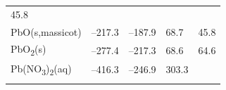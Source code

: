 \documentclass[
]{book}
\theoremstyle{definition}
\theoremstyle{definition}
\theoremstyle{definition}
\theoremstyle{remark}
\begin{document}
\begin{longtable}[]{@{}lllll@{}}
\begin{minipage}[t]{0.18\columnwidth}
45.8\strut
\end{minipage}\tabularnewline
\begin{minipage}[t]{0.10\columnwidth}\raggedright
PbO(s,massicot)\strut
\end{minipage} & \begin{minipage}[t]{0.19\columnwidth}\raggedright
--217.3\strut
\end{minipage} & \begin{minipage}[t]{0.20\columnwidth}\raggedright
--187.9\strut
\end{minipage} & \begin{minipage}[t]{0.18\columnwidth}\raggedright
68.7\strut
\end{minipage} & \begin{minipage}[t]{0.18\columnwidth}\raggedright
45.8\strut
\end{minipage}\tabularnewline
\begin{minipage}[t]{0.10\columnwidth}\raggedright
PbO\textsubscript{2}(s)\strut
\end{minipage} & \begin{minipage}[t]{0.19\columnwidth}\raggedright
--277.4\strut
\end{minipage} & \begin{minipage}[t]{0.20\columnwidth}\raggedright
--217.3\strut
\end{minipage} & \begin{minipage}[t]{0.18\columnwidth}\raggedright
68.6\strut
\end{minipage} & \begin{minipage}[t]{0.18\columnwidth}\raggedright
64.6\strut
\end{minipage}\tabularnewline
\begin{minipage}[t]{0.10\columnwidth}\raggedright
Pb(NO\textsubscript{3})\textsubscript{2}(aq)\strut
\end{minipage} & \begin{minipage}[t]{0.19\columnwidth}\raggedright
--416.3\strut
\end{minipage} & \begin{minipage}[t]{0.20\columnwidth}\raggedright
--246.9\strut
\end{minipage} & \begin{minipage}[t]{0.18\columnwidth}\raggedright
303.3\strut
\end{minipage} & \begin{minipage}[t]{0.18\columnwidth}\raggedright
\strut
\end{minipage}\tabularnewline
\begin{minipage}[t]{0.10\columnwidth}\raggedright

\end{minipage}
\end{longtable}
\end{document}
